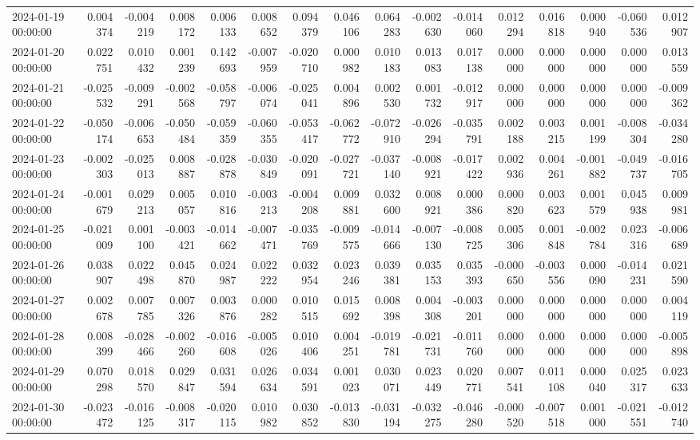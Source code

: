 \begin{tabular}{lrrrrrrrrrrrrrrr}
2024-01-19 00:00:00 & 0.004374 & -0.004219 & 0.008172 & 0.006133 & 0.008652 & 0.094379 & 0.046106 & 0.064283 & -0.002630 & -0.014060 & 0.012294 & 0.016818 & 0.000940 & -0.060536 & 0.012907 \\
2024-01-20 00:00:00 & 0.022751 & 0.010432 & 0.001239 & 0.142693 & -0.007959 & -0.020710 & 0.000982 & 0.010183 & 0.013083 & 0.017138 & 0.000000 & 0.000000 & 0.000000 & 0.000000 & 0.013559 \\
2024-01-21 00:00:00 & -0.025532 & -0.009291 & -0.002568 & -0.058797 & -0.006074 & -0.025041 & 0.004896 & 0.002530 & 0.001732 & -0.012917 & 0.000000 & 0.000000 & 0.000000 & 0.000000 & -0.009362 \\
2024-01-22 00:00:00 & -0.050174 & -0.006653 & -0.050484 & -0.059359 & -0.060355 & -0.053417 & -0.062772 & -0.072910 & -0.026294 & -0.035791 & 0.002188 & 0.003215 & 0.001199 & -0.008304 & -0.034280 \\
2024-01-23 00:00:00 & -0.002303 & -0.025013 & 0.008887 & -0.028878 & -0.030849 & -0.020091 & -0.027721 & -0.037140 & -0.008921 & -0.017422 & 0.002936 & 0.004261 & -0.001882 & -0.049737 & -0.016705 \\
2024-01-24 00:00:00 & -0.001679 & 0.029213 & 0.005057 & 0.010816 & -0.003213 & -0.004208 & 0.009881 & 0.032600 & 0.008921 & 0.000386 & 0.000820 & 0.003623 & 0.001579 & 0.045938 & 0.009981 \\
2024-01-25 00:00:00 & -0.021009 & 0.001100 & -0.003421 & -0.014662 & -0.007471 & -0.035769 & -0.009575 & -0.014666 & -0.007130 & -0.008725 & 0.005306 & 0.001848 & -0.002784 & 0.023316 & -0.006689 \\
2024-01-26 00:00:00 & 0.038907 & 0.022498 & 0.045870 & 0.024987 & 0.022222 & 0.032954 & 0.023246 & 0.039381 & 0.035153 & 0.035393 & -0.000650 & -0.003556 & 0.000090 & -0.014231 & 0.021590 \\
2024-01-27 00:00:00 & 0.002678 & 0.007785 & 0.007326 & 0.003876 & 0.000282 & 0.010515 & 0.015692 & 0.008398 & 0.004308 & -0.003201 & 0.000000 & 0.000000 & 0.000000 & 0.000000 & 0.004119 \\
2024-01-28 00:00:00 & 0.008399 & -0.028466 & -0.002260 & -0.016608 & -0.005026 & 0.010406 & 0.004251 & -0.019781 & -0.021731 & -0.011760 & 0.000000 & 0.000000 & 0.000000 & 0.000000 & -0.005898 \\
2024-01-29 00:00:00 & 0.070298 & 0.018570 & 0.029847 & 0.031594 & 0.026634 & 0.034591 & 0.001023 & 0.030071 & 0.023449 & 0.020771 & 0.007541 & 0.011108 & 0.000040 & 0.025317 & 0.023633 \\
2024-01-30 00:00:00 & -0.023472 & -0.016125 & -0.008317 & -0.020115 & 0.010982 & 0.030852 & -0.013830 & -0.031194 & -0.032275 & -0.046280 & -0.000520 & -0.007518 & 0.001000 & -0.021551 & -0.012740 \\

\end{tabular}
